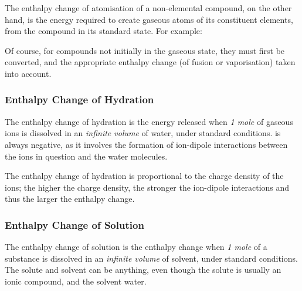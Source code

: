 				The enthalpy change of atomisation of a non-elemental compound, on the other hand, is the energy required to create gaseous
				atoms of its constituent elements, from the compound in its standard state. For example:


				Of course, for compounds not initially in the gaseous state, they must first be converted, and the appropriate enthalpy
				change (of fusion or vaporisation) taken into account.



			\subsubsection{Enthalpy Change of Hydration}


				The enthalpy change of hydration is the energy released when \emph{1 mole} of gaseous ions is dissolved in an
				\emph{infinite volume} of water, under standard conditions.  is always negative, as it involves the
				formation of ion-dipole interactions between the ions in question and the water molecules.


				The enthalpy change of hydration is proportional to the charge density of the ions; the higher the charge density,
				the stronger the ion-dipole interactions and thus the larger the enthalpy change.


			\subsubsection{Enthalpy Change of Solution}

				The enthalpy change of solution is the enthalpy change when \emph{1 mole} of a substance is dissolved in an \emph{infinite volume}
				of solvent, under standard conditions. The solute and solvent can be anything, even though the solute is usually an ionic compound,
				and the solvent water.


